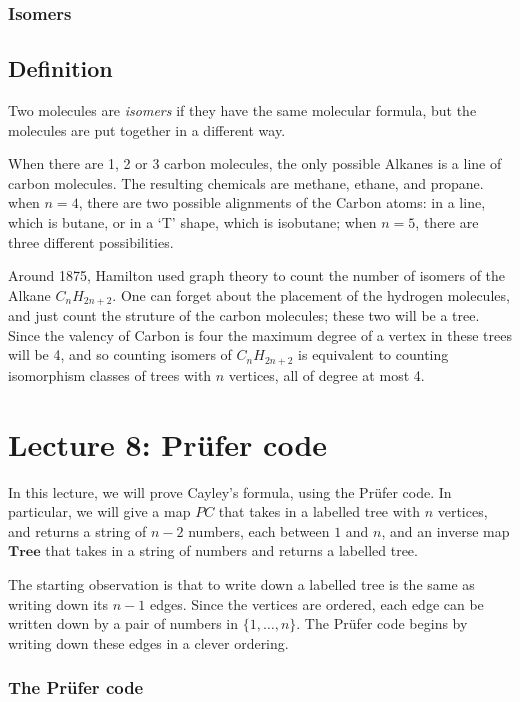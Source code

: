 \documentclass[]{article}
\begin{document}
\subsubsection{Isomers}\label{isomers}

\subsection{Definition}\label{definition-5}

Two molecules are \emph{isomers} if they have the same molecular
formula, but the molecules are put together in a different way.

When there are 1, 2 or 3 carbon molecules, the only possible Alkanes is
a line of carbon molecules. The resulting chemicals are methane, ethane,
and propane. when \(n=4\), there are two possible alignments of the
Carbon atoms: in a line, which is butane, or in a `T' shape, which is
isobutane; when \(n=5\), there are three different possibilities.

Around 1875, Hamilton used graph theory to count the number of isomers
of the Alkane \(C_nH_{2n+2}\). One can forget about the placement of the
hydrogen molecules, and just count the struture of the carbon molecules;
these two will be a tree. Since the valency of Carbon is four the
maximum degree of a vertex in these trees will be 4, and so counting
isomers of \(C_nH_{2n+2}\) is equivalent to counting isomorphism classes
of trees with \(n\) vertices, all of degree at most 4.

\section{Lecture 8: Prüfer code}

In this lecture, we will prove Cayley's formula, using the Prüfer code.
In particular, we will give a map \(PC\) that takes in a labelled tree
with \(n\) vertices, and returns a string of \(n-2\) numbers, each
between \(1\) and \(n\), and an inverse map \(\mathbf{Tree}\) that takes
in a string of numbers and returns a labelled tree.

The starting observation is that to write down a labelled tree is the
same as writing down its \(n-1\) edges. Since the vertices are ordered,
each edge can be written down by a pair of numbers in
\(\{1,\dots,n \}\). The Prüfer code begins by writing down these edges
in a clever ordering.

\subsubsection{The Prüfer code}\label{the-pruxfcfer-code}
\end{document}
